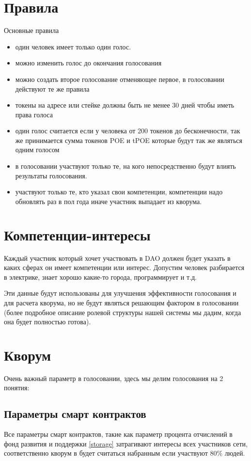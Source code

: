 \documentclass[a4paper,12pt]{report}
\begin{document}
\section{Правила}

Основные правила

\begin{itemize}
	\item один человек имеет только один голос.
	\item можно изменить голос до окончания голосования
	\item можно создать второе голосование отменяющее первое, в голосовании действуют те же правила
	\item токены на адресе или стейке должны быть не менее 30 дней чтобы иметь права голоса
	\item один голос считается если у человека от 200 токенов до бесконечности, так же принимается сумма токенов POE и tPOE которые будут так же являться одним голосом
	\item в голосовании участвуют только те, на кого непосредственно будут влиять результаты голосования.
	\item участвуют только те, кто указал свои компетенции, компетенции надо обновлять раз в пол года иначе участник выпадает из кворума.
	
\end{itemize}


\section{Компетенции-интересы}
Каждый участник который хочет участвовать в DAO должен будет указать в каких сферах он имеет компетенции или интерес. Допустим человек разбирается в электрике, знает хорошо какие-то города, программирует и т.д.

Эти данные будут использованы для улучшения эффективности голосования и для расчета кворума, но не будут являться решающим фактором в голосовании (более подробное описание ролевой структуры нашей системы мы дадим, когда она будет полностью готова).

\section{Кворум}
	
Очень важный параметр в голосовании, здесь мы делим голосования на 2 понятия:

\subsection{Параметры смарт контрактов}
Все параметры смарт контрактов, такие как параметр процента отчислений в фонд развития и поддержки \ref{storage} затрагивают интересы всех участников сети, соответственно кворум в будет считаться набранным если участвуют 80\% людей. 
\end{document}

